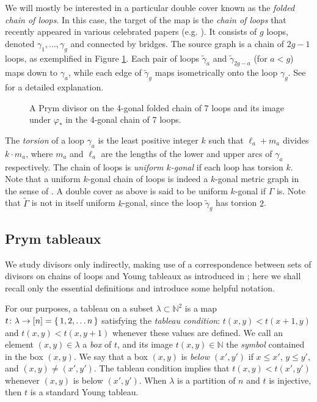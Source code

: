 \documentclass[11pt,reqno]{amsart}
\newcommand*{\N}{\mathbb{N}}
\newcommand*{\maps}{\nobreak\mskip2mu\mathpunct{}\nonscript
  \mkern-\thinmuskip{:}\mskip6muplus1mu\relax}
\newcommand*{\ti}[1]{\tilde{#1}}
\newcommand*{\wti}[1]{\widetilde{#1}}
\theoremstyle{definition}
\theoremstyle{problem}
\theoremstyle{plain}
\theoremstyle{remark}
\theoremstyle{theorem}
\numberwithin{equation}{section}
\numberwithin{figure}{section}
\begin{document}
We will mostly be interested in a particular double cover known as the
\emph{folded chain of loops}. In this case, the target of the map is
the \emph{chain of loops} that recently appeared in various celebrated
papers (e.g. \cite{MRC, Pflueger, JR}). It consists of $g$ loops,
denoted  $\gamma_1,\ldots,\gamma_g$ and connected by bridges. The
source graph is a chain of $2g-1$ loops, as exemplified in Figure
\ref{fig:2}.  Each pair of loops $\ti\gamma_a$ and $\ti\gamma_{2g-a}$
(for $a<g$) maps down to $\gamma_a$, while each edge of $\ti\gamma_g$
maps isometrically onto the loop $\gamma_g$.  See \cite[Section
5.2]{len2019skeletons} for a detailed explanation.

\begin{figure}[H]
  \centering
  
  \caption{A Prym divisor on the 4-gonal folded chain of 7 loops and
    its image under $\varphi_{*}$ in the 4-gonal chain of 7 loops.}
  \label{fig:2}
\end{figure}

The \textit{torsion} of a loop $\gamma_a$ is the least positive
integer $k$ such that $\ell_a+m_a$ divides $k\cdot m_a$, where $m_a$
and $\ell_a$ are the lengths of the lower and upper arcs of $\gamma_a$
respectively.  The chain of loops is \emph{uniform $k$-gonal} if each
loop has torsion $k$. Note that a uniform $k$-gonal chain of loops is
indeed a $k$-gonal metric graph in the sense of \cite[Section
1.3.2]{ABBR152}.  A double cover as above is said to be uniform
$k$-gonal if $\Gamma$ is.  Note that $\wti\Gamma$ is not in itself
uniform $k$-gonal, since the loop $\ti\gamma_g$ has torsion $2$.

\subsection{Prym tableaux}
We study divisors only indirectly, making use of a correspondence
between sets of divisors on chains of loops and Young tableaux as
introduced in \cite{Pflueger, len2019skeletons}; here we shall recall
only the essential definitions and introduce some helpful notation.

For our purposes, a tableau on a subset $\lambda \subset \N^2$ is a map
$t \maps \lambda \to [n] = \set{1,2,\ldots n}$ satisfying the
\textit{tableau condition}: $t(x,y) < t(x+1,y)$ and
$t(x,y) < t(x,y+1)$ whenever these values are defined. We call an element $(x,y) \in \lambda$ a \emph{box} of $t$, and its image $t(x,y) \in \N$ the \emph{symbol} contained in the box $(x,y)$. We say
that a box $(x,y)$ is \textit{below} $(x',y')$ if $x \leq x'$,
$y \leq y'$, and $(x,y) \neq (x',y')$.   The tableau condition implies that $t(x,y)<t(x',y')$ whenever $(x,y)$ is below $(x',y')$.  When $\lambda$ is a partition of $n$ and $t$ is injective, then $t$ is a standard Young tableau.
\end{document}
